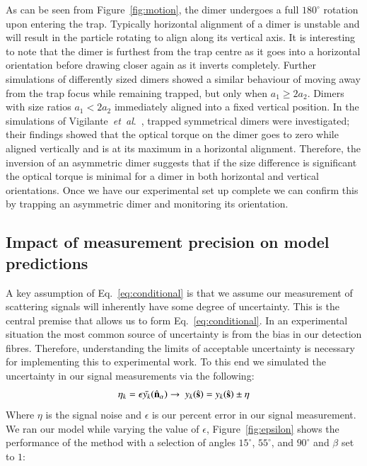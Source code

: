 \documentclass[final,  3p]{elsarticle}
\begin{document}
As can be seen from Figure~\ref{fig:motion}, the dimer undergoes a full $180^{\circ}$ rotation upon entering the trap.  Typically horizontal alignment of a dimer is unstable and will result in the particle rotating to align along its vertical axis.  It is interesting to note that the dimer is furthest from the trap centre as it goes into a horizontal orientation before drawing closer again as it inverts completely. Further simulations of differently sized dimers showed a similar behaviour of moving away from the trap focus while remaining trapped, but only when $a_1 \geq 2a_2$.  Dimers with size ratios $a_1 < 2a_2$ immediately aligned into a fixed vertical position.
%
In the simulations of Vigilante~\emph{et~al}.\ \cite{Vigilante2020Brownian_OT}, trapped symmetrical dimers were investigated; their findings showed that the optical torque on the dimer goes to zero while aligned vertically and is at its maximum in a horizontal alignment. Therefore, the inversion of an asymmetric dimer suggests that if the size difference is significant the optical torque is minimal for a dimer in both horizontal and vertical orientations. Once we have our experimental set up complete we can confirm this by trapping an asymmetric dimer and monitoring its orientation. 
\subsection{Impact of measurement precision on model predictions}
\label{sec:epsilon}

A key assumption of Eq.~\eqref{eq:conditional} is that we assume our measurement of scattering signals will inherently have some degree of uncertainty. This is the central premise that allows us to form Eq.~\eqref{eq:conditional}. In an experimental situation the most common source of uncertainty is from the bias in our detection fibres. Therefore, understanding the limits of acceptable uncertainty is necessary for implementing this to experimental work. To this end we simulated the uncertainty in our signal measurements via the following:
\begin{align}
	\eta_k = \epsilon \bar{y_k}(\hat{\bf n}_\alpha)
	\rightarrow \ y_k(\hat{\bf{s}}) = y_k(\hat{\bf{s}}) \pm \eta
\end{align}
Where $\eta$ is the signal noise and $\epsilon$ is our percent error in our signal measurement. We ran our model while varying the value of $\epsilon$, Figure~\ref{fig:epsilon} shows the performance of the method with a selection of angles $15^{\circ}$, $55^{\circ}$, and $90^{\circ}$ and $\beta$ set to $1$:
\end{document}
